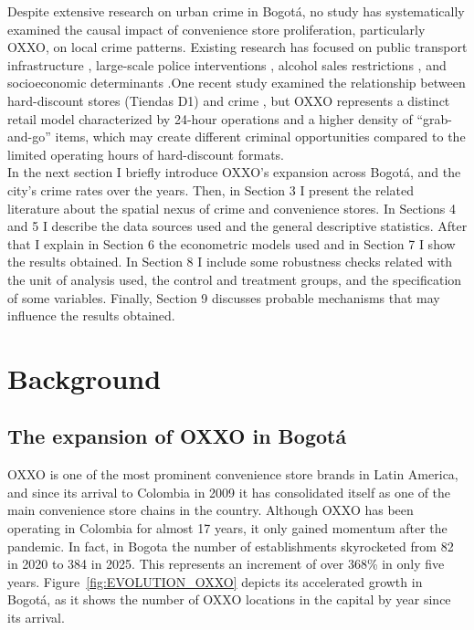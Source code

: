 \documentclass[12pt]{article}
\begin{document}
Despite extensive research on urban crime in Bogotá, no study has systematically examined the causal impact of convenience store proliferation, particularly OXXO, on local crime patterns. Existing research has focused on public transport infrastructure \parencite{Bacares2013a,Bacares2013b,Garcia2005}, large-scale police interventions \parencite{Blattman2017,Blattman2021}, alcohol sales restrictions \parencite{Mello2013}, and socioeconomic determinants \parencite{Escobar2012}.One recent study examined the relationship between hard-discount stores (Tiendas D1) and crime \parencite{Lopez2024}, but OXXO represents a distinct retail model characterized by 24-hour operations and a higher density of ``grab-and-go'' items, which may create different criminal opportunities compared to the limited operating hours of hard-discount formats.\\

In the next section I briefly introduce OXXO’s expansion across Bogotá, and the city’s crime rates over the years. Then, in Section 3 I present the related literature about the spatial nexus of crime and convenience stores. In Sections 4 and 5 I describe the data sources used and the general descriptive statistics. After that I explain in Section 6 the econometric models used and in Section 7 I show the results obtained. In Section 8 I include some robustness checks related with the unit of analysis used, the control and treatment groups, and the specification of some variables. Finally, Section 9 discusses probable mechanisms that may influence the results obtained.

\section{Background}
\subsection{The expansion of OXXO in Bogotá}
OXXO is one of the most prominent convenience store brands in Latin America, and since its arrival to Colombia in 2009 it has consolidated itself as one of the main convenience store chains in the country. 
Although OXXO has been operating in Colombia for almost 17 years, it only gained momentum after the pandemic. 
In fact, in Bogota the number of establishments skyrocketed from 82 in 2020 to 384 in 2025. 
This represents an increment of over 368\% in only five years. Figure~\ref{fig:EVOLUTION_OXXO} depicts its accelerated growth in Bogotá, as it shows the number of OXXO locations in the capital by year since its arrival.\\
\end{document}
